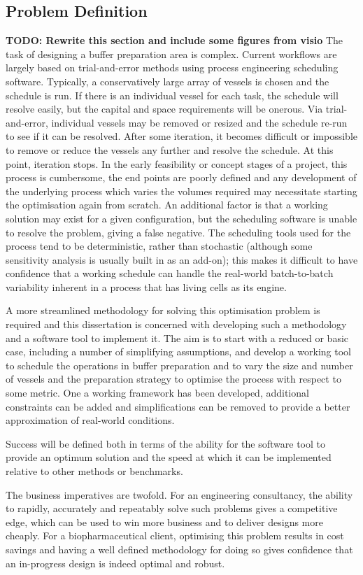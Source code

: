 \subsection{Problem Definition}\label{SS.probdef}

\textbf{TODO: Rewrite this section and include some figures from visio}
The task of designing a buffer preparation area is complex.
Current workflows are largely based on trial-and-error methods using process
engineering scheduling software.  
Typically, a conservatively large array of vessels is chosen and the schedule
is run.  
If there is an individual vessel for each task, the schedule will resolve
easily, but the capital and space requirements will be onerous.
Via trial-and-error, individual vessels may be removed or resized and
the schedule re-run to see if it can be resolved.  
After some iteration, it becomes difficult or impossible to remove or reduce
the vessels any further and resolve the schedule.
At this point, iteration stops.
In the early feasibility or concept stages of a project, this process is
cumbersome, the end points are poorly defined and any development of the
underlying process which varies the volumes required may necessitate starting
the optimisation again from scratch.
An additional factor is that a working solution may exist for a given
configuration, but the scheduling software is unable to resolve the problem,
giving a false negative. 
The scheduling tools used for the process tend to be deterministic, rather than
stochastic (although some sensitivity analysis is usually built in as an 
add-on); this makes it difficult to have confidence that a working schedule can
handle the real-world batch-to-batch variability inherent in a process that has
living cells as its engine.

A more streamlined methodology for solving this optimisation problem is
required and this dissertation is concerned with developing such a methodology
and a software tool to implement it.
The aim is to start with a reduced or basic case, including a number of
simplifying assumptions, and develop a working tool to schedule the operations
in buffer preparation and to vary the size and number of vessels and the 
preparation strategy to optimise the process with respect to some metric.
One a working framework has been developed, additional constraints can be added
and simplifications can be removed to provide a better approximation of 
real-world conditions.

Success will be defined both in terms of the ability for the software tool to
provide an optimum solution and the speed at which it can be implemented
relative to other methods or benchmarks.

The business imperatives are twofold.
For an engineering consultancy, the ability to rapidly, accurately and
repeatably solve such problems gives a competitive edge, which can be used to
win more business and to deliver designs more cheaply.  For a biopharmaceutical
client, optimising this problem results in cost savings and having a well
defined methodology for doing so gives confidence that an in-progress design is
indeed optimal and robust.

